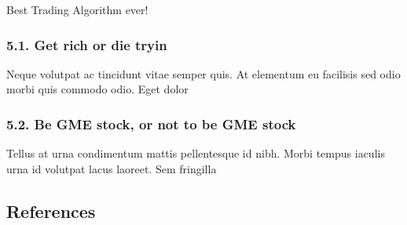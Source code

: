 \documentclass[
]{article}
\begin{document}
Best Trading Algorithm ever!

\hypertarget{get-rich-or-die-tryin}{%
\subsubsection{5.1. Get rich or die tryin}\label{get-rich-or-die-tryin}}

Neque volutpat ac tincidunt vitae semper quis. At elementum eu facilisis
sed odio morbi quis commodo odio. Eget dolor

\hypertarget{be-gme-stock-or-not-to-be-gme-stock}{%
\subsubsection{5.2. Be GME stock, or not to be GME
stock}\label{be-gme-stock-or-not-to-be-gme-stock}}

Tellus at urna condimentum mattis pellentesque id nibh. Morbi tempus
iaculis urna id volutpat lacus laoreet. Sem fringilla

\newpage

\hypertarget{references}{%
\subsection{References}\label{references}}
\end{document}
